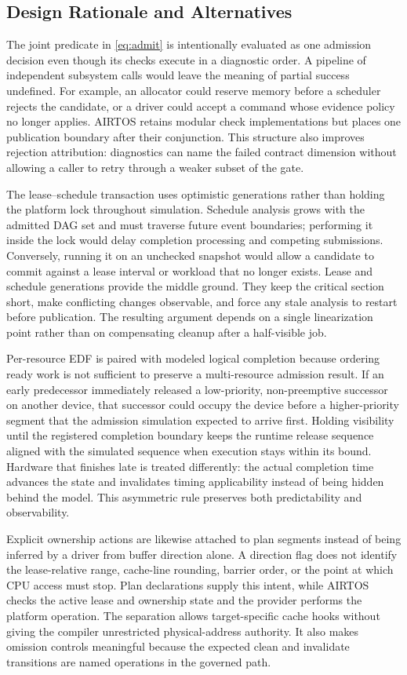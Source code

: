 \documentclass[lettersize,journal]{IEEEtran}
\begin{document}
\subsection{Design Rationale and Alternatives}
The joint predicate in \cref{eq:admit} is intentionally evaluated as one
admission decision even though its checks execute in a diagnostic order. A
pipeline of independent subsystem calls would leave the meaning of partial
success undefined. For example, an allocator could reserve memory before a
scheduler rejects the candidate, or a driver could accept a command whose
evidence policy no longer applies. AIRTOS retains modular check implementations
but places one publication boundary after their conjunction. This structure
also improves rejection attribution: diagnostics can name the failed contract
dimension without allowing a caller to retry through a weaker subset of the
gate.

The lease--schedule transaction uses optimistic generations rather than
holding the platform lock throughout simulation. Schedule analysis grows with
the admitted DAG set and must traverse future event boundaries; performing it
inside the lock would delay completion processing and competing submissions.
Conversely, running it on an unchecked snapshot would allow a candidate to
commit against a lease interval or workload that no longer exists. Lease and
schedule generations provide the middle ground. They keep the critical section
short, make conflicting changes observable, and force any stale analysis to
restart before publication. The resulting argument depends on a single
linearization point rather than on compensating cleanup after a half-visible
job.

Per-resource EDF is paired with modeled logical completion because ordering
ready work is not sufficient to preserve a multi-resource admission result.
If an early predecessor immediately released a low-priority, non-preemptive
successor on another device, that successor could occupy the device before a
higher-priority segment that the admission simulation expected to arrive
first. Holding visibility until the registered completion boundary keeps the
runtime release sequence aligned with the simulated sequence when execution
stays within its bound. Hardware that finishes late is treated differently:
the actual completion time advances the state and invalidates timing
applicability instead of being hidden behind the model. This asymmetric rule
preserves both predictability and observability.

Explicit ownership actions are likewise attached to plan segments instead of
being inferred by a driver from buffer direction alone. A direction flag does
not identify the lease-relative range, cache-line rounding, barrier order, or
the point at which CPU access must stop. Plan declarations supply this intent,
while AIRTOS checks the active lease and ownership state and the provider
performs the platform operation. The separation allows target-specific cache
hooks without giving the compiler unrestricted physical-address authority. It
also makes omission controls meaningful because the expected clean and
invalidate transitions are named operations in the governed path.
\end{document}
